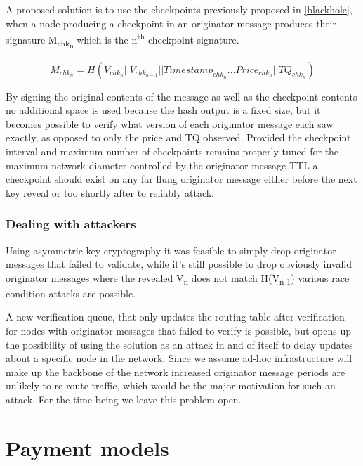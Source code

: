 \documentclass[11pt]{article}
\begin{document}
                        A proposed solution is to use the checkpoints previously proposed in \ref{blackhole}, when a node producing a checkpoint in an originator message produces their signature M\textsubscript{chk\textsubscript{n}} which is the n\textsuperscript{th} checkpoint signature.
                        
                        \[M_{chk_n} = H(V_{chk_n}||V_{chk_{n+1}}||Timestamp_{chk_n}...Price_{chk_n}||TQ_{chk_n})\]
                        
                        By signing the original contents of the message as well as the checkpoint contents no additional space is used because the hash output is a fixed size, but it becomes possible to verify what version of each originator message each saw exactly, as opposed to only the price and TQ observed. Provided the checkpoint interval and maximum number of checkpoints remains properly tuned for the maximum network diameter controlled by the originator message TTL a checkpoint should exist on any far flung originator message either before the next key reveal or too shortly after to reliably attack.
                                                
               \subsubsection{Dealing with attackers}
               
                      Using asymmetric key cryptography it was feasible to simply drop originator messages that failed to validate, while it's still possible to drop obviously invalid originator messages where the revealed V\textsubscript{n} does not match H(V\textsubscript{n-1}) various race condition attacks are possible. 
                          
                      A new verification queue, that only updates the routing table after verification for nodes with originator messages that failed to verify is possible, but opens up the possibility of using the solution as an attack in and of itself to delay updates about a specific node in the network. Since we assume ad-hoc infrastructure will make up the backbone of the network increased originator message periods are unlikely to re-route traffic, which would be the major motivation for such an attack. For the time being we leave this problem open.
                
\section{Payment models} \label{pay}
\end{document}
